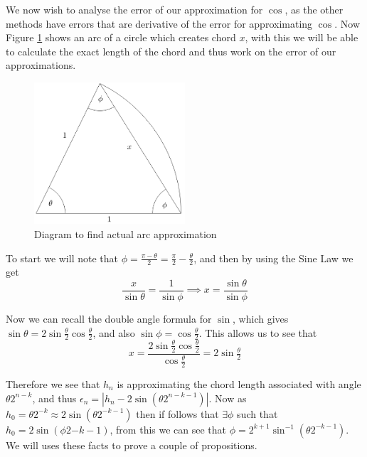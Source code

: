 We now wish to analyse the error of our approximation for \(\cos\), as the other methods have errors that are derivative of the error for approximating \(\cos\). Now Figure \ref{FIG_"Geometric Trig 4"} shows an arc of a circle which creates chord \(x\), with this we will be able to calculate the exact length of the chord and thus work on the error of our approximations.\\

\begin{figure}[!ht]
	\caption{Diagram to find actual arc approximation}
	\label{FIG_"Geometric Trig 4"}
	\centering
	\includegraphics[width=0.5\textwidth]{"./Diagrams/Geometric Trig Diagram 4"}
\end{figure}

To start we will note that \(\phi = \frac{\pi - \theta}{2} = \frac{\pi}{2} - \frac{\theta}{2}\), and then by using the Sine Law we get 
\[\frac{x}{\sin\theta} = \frac{1}{\sin\phi} \implies x = \frac{\sin\theta}{\sin\phi}\]

Now we can recall the double angle formula for \(\sin\), which gives \(\sin\theta = 2\sin\frac{\theta}{2}\cos\frac{\theta}{2}\), and also \(\sin\phi = \cos\frac{\theta}{2}\). This allows us to see that
\[x = \frac{2\sin\frac{\theta}{2}\cos\frac{\theta}{2}}{\cos\frac{\theta}{2}} = 2\sin\tfrac{\theta}{2}\]

Therefore we see that \(h_n\) is approximating the chord length associated with angle \(\theta2^{n-k}\), and thus \(\epsilon_n = |h_n - 2\sin(\theta2^{n-k-1})|\). Now as \(h_0 =\theta2^{-k} \approx 2\sin(\theta2^{-k-1})\) then if follows that \(\exists \phi\) such that \(h_0 = 2\sin(\phi2{-k-1})\), from this we can see that \(\phi = 2^{k+1}\sin^{-1}(\theta2^{-k-1})\). We will uses these facts to prove a couple of propositions.

